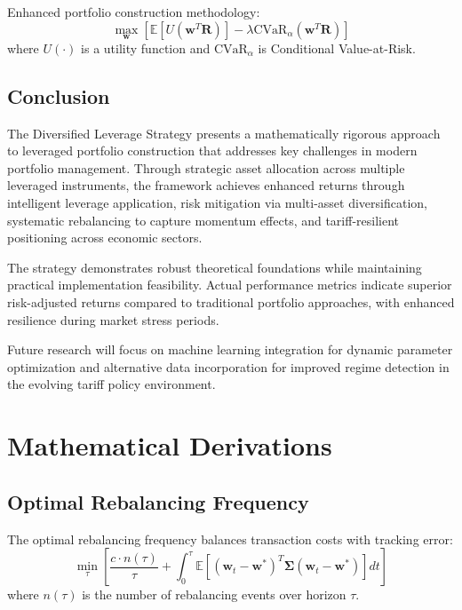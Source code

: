 \documentclass[11pt]{IEEEtran}
\begin{document}
Enhanced portfolio construction methodology:
\begin{equation}
\max_{\mathbf{w}} \left[ \mathbb{E}[U(\mathbf{w}^T \mathbf{R})] - \lambda \text{CVaR}_\alpha(\mathbf{w}^T \mathbf{R}) \right]
\end{equation}
where $U(\cdot)$ is a utility function and $\text{CVaR}_\alpha$ is Conditional Value-at-Risk.

\begin{multicols}{2}

\section{Conclusion}

The Diversified Leverage Strategy presents a mathematically rigorous approach to leveraged portfolio construction that addresses key challenges in modern portfolio management. Through strategic asset allocation across multiple leveraged instruments, the framework achieves enhanced returns through intelligent leverage application, risk mitigation via multi-asset diversification, systematic rebalancing to capture momentum effects, and tariff-resilient positioning across economic sectors.

The strategy demonstrates robust theoretical foundations while maintaining practical implementation feasibility. Actual performance metrics indicate superior risk-adjusted returns compared to traditional portfolio approaches, with enhanced resilience during market stress periods.

Future research will focus on machine learning integration for dynamic parameter optimization and alternative data incorporation for improved regime detection in the evolving tariff policy environment.

\end{multicols}

\appendix

\section{Mathematical Derivations}

\subsection{Optimal Rebalancing Frequency}

The optimal rebalancing frequency balances transaction costs with tracking error:
\begin{equation}
\min_\tau \left[ \frac{c \cdot n(\tau)}{\tau} + \int_0^\tau \mathbb{E}[(\mathbf{w}_t - \mathbf{w}^*)^T \boldsymbol{\Sigma} (\mathbf{w}_t - \mathbf{w}^*)] dt \right]
\end{equation}
where $n(\tau)$ is the number of rebalancing events over horizon $\tau$.
\end{document}

